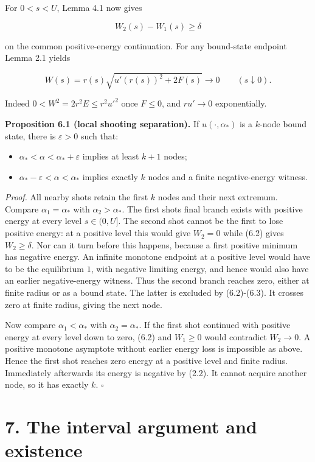 \documentclass[11pt]{article}
\providecommand{\tightlist}{\setlength{\itemsep}{0pt}\setlength{\parskip}{0pt}}
\begin{document}
For \(0<s<U\), Lemma 4.1 now gives

\[W_2(s)-W_1(s)\geq\delta \tag{6.2}\]

on the common positive-energy continuation. For any bound-state endpoint
Lemma 2.1 yields

\[W(s)=r(s)\sqrt{u'(r(s))^2+2F(s)}\longrightarrow0\qquad(s\downarrow0). \tag{6.3}\]

Indeed \(0<W^2=2r^2E\leq r^2u'^2\) once \(F\leq0\), and \(ru'\to0\)
exponentially.

\textbf{Proposition 6.1 (local shooting separation).} If
\(u(\cdot,\alpha_*)\) is a \(k\)-node bound state, there is
\(\varepsilon>0\) such that:

\begin{itemize}
\tightlist
\item
  \(\alpha_*<\alpha<\alpha_*+\varepsilon\) implies at least \(k+1\)
  nodes;
\item
  \(\alpha_*-\varepsilon<\alpha<\alpha_*\) implies exactly \(k\) nodes
  and a finite negative-energy witness.
\end{itemize}

\emph{Proof.} All nearby shots retain the first \(k\) nodes and their
next extremum. Compare \(\alpha_1=\alpha_*\) with \(\alpha_2>\alpha_*\).
The first shot\textquotesingle s final branch exists with positive
energy at every level \(s\in(0,U]\). The second shot cannot be the first
to lose positive energy: at a positive level this would give \(W_2=0\)
while (6.2) gives \(W_2\geq\delta\). Nor can it turn before this
happens, because a first positive minimum has negative energy. An
infinite monotone endpoint at a positive level would have to be the
equilibrium \(1\), with negative limiting energy, and hence would also
have an earlier negative-energy witness. Thus the second branch reaches
zero, either at finite radius or as a bound state. The latter is
excluded by (6.2)-(6.3). It crosses zero at finite radius, giving the
next node.

Now compare \(\alpha_1<\alpha_*\) with \(\alpha_2=\alpha_*\). If the
first shot continued with positive energy at every level down to zero,
(6.2) and \(W_1\geq0\) would contradict \(W_2\to0\). A positive monotone
asymptote without earlier energy loss is impossible as above. Hence the
first shot reaches zero energy at a positive level and finite radius.
Immediately afterwards its energy is negative by (2.2). It cannot
acquire another node, so it has exactly \(k\). \(\square\)

\section{7. The interval argument and
existence}\label{the-interval-argument-and-existence}
\end{document}
